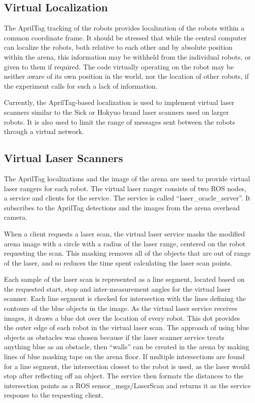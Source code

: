 \subsection{Virtual Localization} \label{section:Virtual_Localization}

The AprilTag tracking of the robots provides localization of the robots within a common coordinate frame. 
It should be stressed that while the central computer can localize the robots, both relative to each other and by absolute position within the arena, this information may be withheld from the individual robots, or given to them if required. 
The code virtually operating on the robot may be neither aware of its own position in the world, nor the location of other robots, if the experiment calls for such a lack of information. 

Currently, the AprilTag-based localization is used to implement virtual laser scanners similar to the Sick or Hokyuo brand laser scanners used on larger robots. 
It is also used to limit the range of messages sent between the robots through a virtual network. 

\subsection{Virtual Laser Scanners} \label{section:Virtual_Laser_Scanners}

The AprilTag localizations and the image of the arena are used to provide virtual laser rangers for each robot. 
The virtual laser ranger consists of two ROS nodes, a service and clients for the service. 
The service is called ``laser\_oracle\_server''. 
It subscribes to the AprilTag detections and the images from the arena overhead camera. 
 
When a client requests a laser scan, the virtual laser service masks the modified arena image with a circle with a radius of the laser range, centered on the robot requesting the scan.
This masking removes all of the objects that are out of range of the laser, and so reduces the time spent calculating the laser scan points. 

Each sample of the laser scan is represented as a line segment, located based on the requested start, stop and inter-measurement angles for the virtual laser scanner. 
Each line segment is checked for intersection with the lines defining the contours of the blue objects in the image. 
As the virtual laser service receives images, it draws a blue dot over the location of every robot. 
This dot provides the outer edge of each robot in the virtual laser scan. 
The approach of using blue objects as obstacles was chosen because if the laser scanner service treats anything blue as an obstacle, then ``walls'' can be created in the arena by making lines of blue masking tape on the arena floor. 
If multiple intersections are found for a line segment, the intersection closest to the robot is used, as the laser would stop after reflecting off an object.
The service then formats the distances to the intersection points as a ROS sensor\_msgs/LaserScan and returns it as the service response to the requesting client. 

